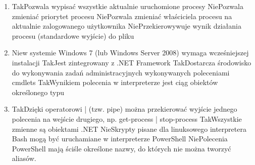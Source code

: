 \begin{enumerate}
		{Nie}{Dotyczy wszystkich procesów (a* = all)}%
		{Nie}{Jest poleceniem błędnym – nie wykona się}%
		{Tak}{Zatrzyma procesy, których lista jest pobierana za pomocą polecenia get-process a*}%
		{Tak}{Dotyczy tylko procesów, których nazwa zaczyna się na literę „a”}
		\item {}%
		{Tak}{Pozwala wypisać wszystkie aktualnie uruchomione procesy}%
		{Nie}{Pozwala zmieniać priorytet procesu}%
		{Nie}{Pozwala zmieniać właściciela procesu na aktualnie zalogowanego użytkownika}%
		{Nie}{Przekierowywuje wynik działania procesu (standardowe wyjście) do pliku}
		\item {}%
		{Nie}{w systemie Windows 7 (lub Windows Server 2008) wymaga wcześniejszej instalacji}%
		{Tak}{Jest zintegrowany z .NET Framework}%
		{Tak}{Dostarcza środowisko do wykonywania zadań administracyjnych wykonywanych poleceniami cmdlets}%
		{Tak}{Wynikiem polecenia w interpreterze jest ciąg obiektów określonego typu}
		\item {}%
		{Tak}{Dzięki operatorowi | (tzw. pipe) można przekierować wyjście jednego polecenia na wejście drugiego, np. get-process | stop-process}%
		{Tak}{Wszystkie zmienne są obiektami .NET}%
		{Nie}{Skrypty pisane dla linuksowego interpretera Bash mogą być uruchamiane w interpreterze PowerShell}%
		{Nie}{Polecenia PowerShell mają ściśle określone nazwy, do których nie można tworzyć aliasów.}
		
		
	\end{enumerate}